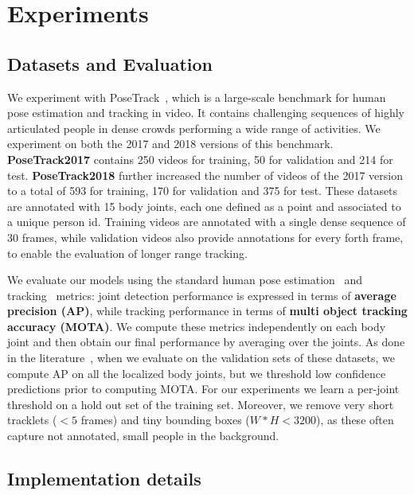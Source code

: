 \documentclass[10pt,twocolumn,letterpaper]{article}
\begin{document}
\section{Experiments}\label{sec:exp}

\subsection {Datasets and Evaluation}
We experiment with PoseTrack~\cite{PoseTrack}, which is a large-scale benchmark for human pose estimation and tracking in video. It contains challenging sequences of highly articulated people in dense crowds performing a wide range of activities.
We experiment on both the 2017 and 2018 versions of this benchmark. 
{\bf PoseTrack2017} contains 250 videos for training, 50 for validation and 214 for test. {\bf PoseTrack2018} further increased the number of videos of the 2017 version to a total of 593 for training, 170 for validation and 375 for test. 
These datasets are annotated with 15 body joints, each one defined as a point and associated to a unique person id. Training videos are annotated with a single dense sequence of 30 frames, while validation videos also provide annotations for every forth frame, to enable the evaluation of longer range tracking. 

We evaluate our models using the standard human pose estimation~\cite{pishchulin16cvpr,lin2014microsoft,ronchi17iccv} and tracking~\cite{milan2016mot16,PoseTrack} metrics: joint detection performance is expressed in terms of {\bf average precision (AP)}, while tracking performance in terms of {\bf multi object tracking accuracy (MOTA)}. We compute these metrics independently on each body joint and then obtain our final performance by averaging over the joints. As done in the literature~\cite{girdhar2018detecttrack, xiao2018simple, sun2019deep}, when we evaluate on the validation sets of these datasets, we compute AP on all the localized body joints, but we threshold low confidence predictions prior to computing MOTA.
For our experiments we learn a per-joint threshold on a hold out set of the training set. Moreover, we remove very short tracklets ($<5$ frames) and tiny bounding boxes ($W*H<3200$), as these often capture not annotated, small people in the background.

\subsection {Implementation details}\label{sec:impl_details}
\end{document}
